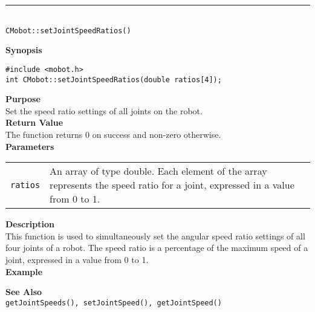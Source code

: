 \noindent
\vspace{5pt}
\rule{4.5in}{0.015in}\\
\noindent
{\LARGE \texttt{CMobot::setJointSpeedRatios()}}\\
{}

\noindent
{\bf Synopsis}\\
\begin{verbatim}
#include <mobot.h>
int CMobot::setJointSpeedRatios(double ratios[4]);
\end{verbatim}

\noindent
{\bf Purpose}\\
Set the speed ratio settings of all joints on the robot.\\

\noindent
{\bf Return Value}\\
The function returns 0 on success and non-zero otherwise.\\

\noindent
{\bf Parameters}
\vspace{-0.1in}
\begin{description}
\item               
\begin{tabular}{p{10 mm}p{145 mm}}
\texttt{ratios} & An array of type double. Each element of the array
represents the speed ratio for a joint, expressed in a value from 0 to 1. \\
\end{tabular}
\end{description}

\noindent
{\bf Description}\\
This function is used to simultaneously set the angular speed ratio settings of
all four joints of a robot. The speed ratio is a percentage of the maximum
speed of a joint, expressed in a value from 0 to 1.\\

\noindent
{\bf Example}\\
\noindent

\noindent
{\bf See Also}\\
\texttt{getJointSpeeds(), setJointSpeed(), getJointSpeed()}

